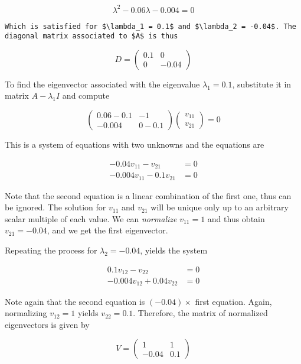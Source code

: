 \documentclass[11pt]{article}
\begin{document}
\[
\lambda^2 - 0.06\lambda -0.004 = 0
\]

\begin{verbatim}
Which is satisfied for $\lambda_1 = 0.1$ and $\lambda_2 = -0.04$. The diagonal matrix associated to $A$ is thus
\end{verbatim}

\[
D = \begin{pmatrix} 0.1 & 0 \\ 0 & -0.04 \end{pmatrix}
\]

To find the eigenvector associated with the eigenvalue
\(\lambda_1 = 0.1\), substitute it in matrix \(A-\lambda_1 I\) and
compute

\[
\begin{pmatrix} 0.06-0.1 & -1 \\ -0.004 & 0 - 0.1 \end{pmatrix}\begin{pmatrix} v_{11} \\ v_{21} \end{pmatrix} = 0
\]

This is a system of equations with two unknowns and the equations are

\[
\begin{align*}
-0.04 v_{11} - v_{21} &= 0 \\
-0.004 v_{11} - 0.1 v_{21} &= 0 
\end{align*}
\]

Note that the second equation is a linear combination of the first one,
thus can be ignored. The solution for \(v_{11}\) and \(v_{21}\) will be
unique only up to an arbitrary scalar multiple of each value. We can
\emph{normalize} \(v_{11} = 1\) and thus obtain \(v_{21} = -0.04\), and
we get the first eigenvector.

Repeating the process for \(\lambda_2 = -0.04\), yields the system

\[
\begin{align*}
0.1 v_{12} - v_{22} &= 0 \\
-0.004 v_{12} + 0.04 v_{22} &= 0
\end{align*}
\]

Note again that the second equation is \((-0.04)\times\) first equation.
Again, normalizing \(v_{12} = 1\) yields \(v_{22} = 0.1\). Therefore,
the matrix of normalized eigenvectors is given by

\[
V = \begin{pmatrix} 1 & 1 \\ -0.04 & 0.1 \end{pmatrix}
\]
\end{document}
